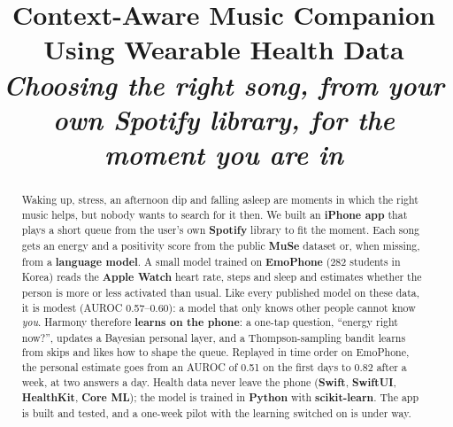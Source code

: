 \documentclass[conference]{IEEEtran}
\begin{document}
\title{Context-Aware Music Companion Using Wearable Health Data\\
{\large\itshape Choosing the right song, from your own Spotify library, for the moment you are in}}

\author{
\and
{}
\and
{}
\and
{}
\and
{}
}

\maketitle

\begin{abstract}
Waking up, stress, an afternoon dip and falling asleep are moments in which the right music helps, but nobody wants to search for it then. We built an \textbf{iPhone app} that plays a short queue from the user's own \textbf{Spotify} library to fit the moment. Each song gets an energy and a positivity score from the public \textbf{MuSe} dataset or, when missing, from a \textbf{language model}. A small model trained on \textbf{EmoPhone} (282 students in Korea) reads the \textbf{Apple Watch} heart rate, steps and sleep and estimates whether the person is more or less activated than usual. Like every published model on these data, it is modest (AUROC 0.57--0.60): a model that only knows other people cannot know \emph{you}. Harmony therefore \textbf{learns on the phone}: a one-tap question, ``energy right now?'', updates a Bayesian personal layer, and a Thompson-sampling bandit learns from skips and likes how to shape the queue. Replayed in time order on EmoPhone, the personal estimate goes from an AUROC of 0.51 on the first days to 0.82 after a week, at two answers a day. Health data never leave the phone (\textbf{Swift}, \textbf{SwiftUI}, \textbf{HealthKit}, \textbf{Core ML}); the model is trained in \textbf{Python} with \textbf{scikit-learn}. The app is built and tested, and a one-week pilot with the learning switched on is under way.
\end{abstract}
\end{document}
